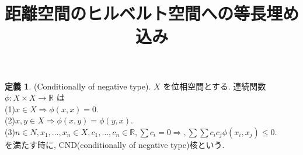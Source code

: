 \documentclass[10pt, fleqn, label-section=none]{bxjsarticle}
\title{距離空間のヒルベルト空間への等長埋め込み}
\date{}
\author{}
\theoremstyle{definition}
\newtheorem{dfn}{定義}[section]
\newcommand{\naraba}{\Rightarrow}
\renewcommand{\;}{\, ; \,}
\begin{document}
\maketitle

\section{}

\begin{dfn}(Conditionally of negative type). $X$ を位相空間とする. 連続関数$\phi: X \times X \rightarrow \mathbb R$ は\\
(1)$x \in X \naraba \phi (x, x) = 0.$ \\
(2)$x, y \in X \naraba \phi (x, y) = \phi(y, x).$ \\
(3)$n \in N, x_1, \ldots, x_n \in X, c_1, \ldots , c_n \in \mathbb R, \sum c_i = 0 \naraba, \sum\sum c_i c_j \phi (x_i, x_j) \leq 0.$ \\
を満たす時に, CND(conditionally of negative type)核という. 

\end{dfn}
\end{document}
